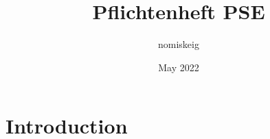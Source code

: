 \documentclass{article}
\title{Pflichtenheft PSE}
\author{nomiskeig }
\date{May 2022}
\begin{document}
\maketitle

\section{Introduction}
\end{document}
